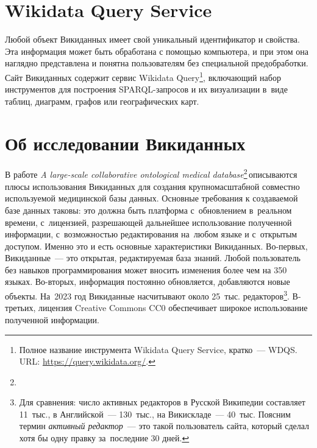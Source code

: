 \section{Wikidata Query Service}
\label{sect:WDQS}

Любой объект Викиданных имеет свой уникальный идентификатор и свойства. 
Эта информация может быть обработана с помощью компьютера, 
и при этом она наглядно представлена и понятна пользователям без специальной предобработки. 
Сайт Викиданных содержит сервис Wikidata Query\footnote{%
%
Полное название инструмента Wikidata Query Service, кратко~--- WDQS. URL: 
\href{https://query.wikidata.org/}{https://query.wikidata.org/}.%
%
}, включающий набор инструментов для построения SPARQL-запросов 
и их визуализации в~виде таблиц, диаграмм, графов или географических карт.




\section{Об исследовании Викиданных}

В работе \textit{A large-scale collaborative ontological medical database}\footnote{%
}\,описываются плюсы использования Викиданных для создания крупномасштабной 
совместно используемой медицинской базы данных. 
Основные требования к создаваемой базе данных таковы: 
это должна быть платформа с~обновлением в~реальном времени, 
с~лицензией, разрешающей дальнейшее использование полученной информации, 
с~возможностью редактирования на~любом языке и с~открытым доступом. 
Именно это и есть основные характеристики Викиданных. 
Во-первых, Викиданные~--- это открытая, редактируемая база знаний. 
Любой пользователь без навыков программирования может вносить изменения 
более чем на 350 языках. 
Во-вторых, информация постоянно обновляется, добавляются новые объекты. 
На~2023 год Викиданные насчитывают около 25~тыс. редакторов\footnote{Для сравнения: 
число активных редакторов в Русской Википедии 
составляет 11~тыс., в Английской~--- 130~тыс., на Викискладе~--- 40~тыс. 
Поясним термин \emph{активный редактор}~--- это такой пользователь сайта, 
который сделал хотя бы одну правку за~последние 30 дней.}. 
В-третьих, лицензия Creative Commons CC0 обеспечивает широкое использование полученной информации. 

